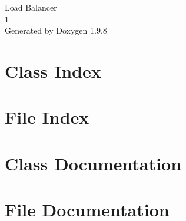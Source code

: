 \documentclass[twoside]{book}
\newcommand{\+}{\discretionary{\mbox{\scriptsize$\hookleftarrow$}}{}{}}
\newcommand{\clearemptydoublepage}{%
    \newpage{\pagestyle{empty}\cleardoublepage}%
  }
\begin{document}
  \raggedbottom
    \hypersetup{pageanchor=false,
                bookmarksnumbered=true,
                pdfencoding=unicode
               }
  \begin{titlepage}
  \vspace*{7cm}
  \begin{center}%
  {\Large Load Balancer}\\
  [1ex]\large 1 \\
  \vspace*{1cm}
  {\large Generated by Doxygen 1.9.8}\\
  \end{center}
  \end{titlepage}
  \clearemptydoublepage
  \tableofcontents
  \clearemptydoublepage
  \hypersetup{pageanchor=true}

\chapter{Class Index}

\chapter{File Index}

\chapter{Class Documentation}







\chapter{File Documentation}









  \backmatter
  \newpage
  \clearemptydoublepage
  \printindex
\end{document}
